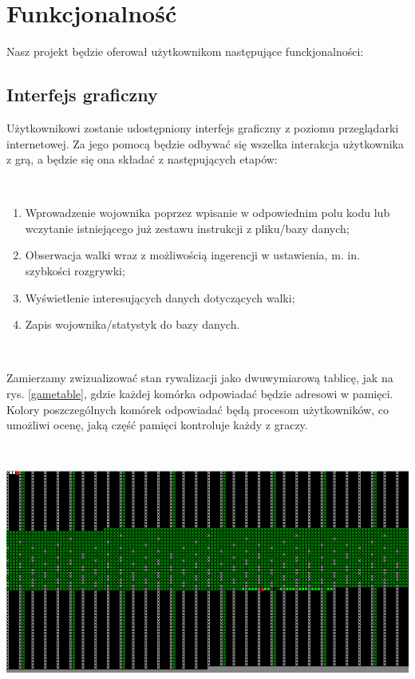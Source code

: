 
{\let\clearpage\relax \chapter{Funkcjonalność}}
Nasz projekt będzie oferował użytkownikom następujące funckjonalności:

\section{Interfejs graficzny}

Użytkownikowi zostanie udostępniony interfejs graficzny z poziomu przeglądarki internetowej. Za jego pomocą będzie odbywać się wszelka interakcja użytkownika z grą, a będzie się ona składać z następujących etapów:

\
\begin{enumerate}
	\item Wprowadzenie wojownika poprzez wpisanie w odpowiednim polu kodu lub wczytanie istniejącego już zestawu instrukcji z pliku/bazy danych;

	\item Obserwacja walki wraz z możliwością ingerencji w ustawienia, m. in. szybkości rozgrywki;

	\item Wyświetlenie interesujących danych dotyczących walki;

	\item Zapis wojownika/statystyk do bazy danych.
	
\end{enumerate}

\

Zamierzamy zwizualizować stan rywalizacji jako dwuwymiarową tablicę, jak na rys. \ref{gametable}, gdzie każdej komórka odpowiadać będzie adresowi w pamięci. Kolory poszczególnych komórek odpowiadać będą procesom użytkowników, co umożliwi ocenę, jaką część pamięci kontroluje każdy z graczy.

\

\includegraphics[width=\linewidth]{utils/pic1.png}
\label{gametable}

